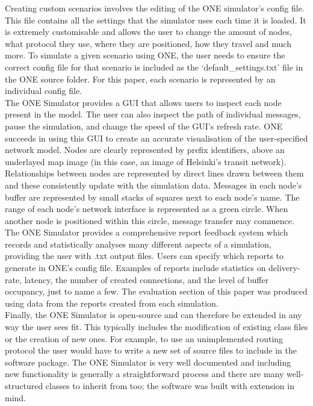 \documentclass{article}
\begin{document}
\newline Creating custom scenarios involves the editing of the ONE simulator's config file. This file contains all the settings that the simulator uses each time it is loaded. It is extremely customisable and allows the user to change the amount of nodes, what protocol they use, where they are positioned, how they travel and much more. To simulate a given scenario using ONE, the user needs to ensure the correct config file for that scenario is included as the `default\_settings.txt' file in the ONE source folder. For this paper, each scenario is represented by an individual config file.\\
\newline The ONE Simulator provides a GUI that allows users to inspect each node present in the model. The user can also inspect the path of individual messages, pause the simulation, and change the speed of the GUI's refresh rate. ONE succeeds in using this GUI to create an accurate visualisation of the user-specified network model. Nodes are clearly represented by prefix identifiers, above an underlayed map image (in this case, an image of Helsinki's transit network). Relationships between nodes are represented by direct lines drawn between them and these consistently update with the simulation data. Messages in each node's buffer are represented by small stacks of squares next to each node's name. The range of each node's network interface is represented as a green circle. When another node is positioned within this circle, message transfer may commence.\\
\newline The ONE Simulator provides a comprehensive report feedback system which records and statistically analyses many different aspects of a simulation, providing the user with .txt output files. Users can specify which reports to generate in ONE's config file. Examples of reports include statistics on delivery-rate, latency, the number of created connections, and the level of buffer occupancy, just to name a few. The evaluation section of this paper was produced using data from the reports created from each simulation.\\
\newline Finally, the ONE Simulator is open-source and can therefore be extended in any way the user sees fit. This typically includes the modification of existing class files or the creation of new ones. For example, to use an unimplemented routing protocol the user would have to write a new set of source files to include in the software package. The ONE Simulator is very well documented and including new functionality is generally a straightforward process and there are many well-structured classes to inherit from too; the software was built with extension in mind.\\
\end{document}
